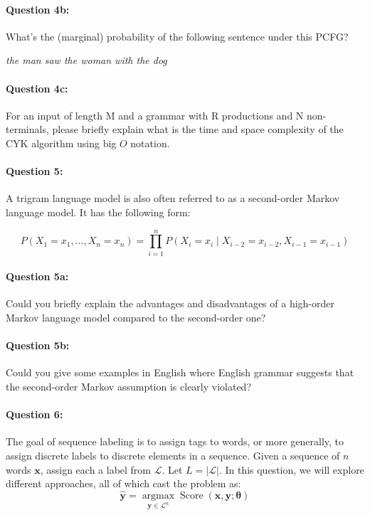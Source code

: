\documentclass[10pt]{article}
\begin{document}
\paragraph{Question 4b:} What's the (marginal) probability of the following sentence under this PCFG?

\textit{the man saw the woman with the dog}

\paragraph{Question 4c:} For an input of length M and a grammar with R productions and N non-terminals, please briefly explain what is the time and space complexity of the CYK algorithm using big $O$ notation.

\newpage

\paragraph{Question 5:} A trigram language model is also often referred to as a second-order Markov language model. It has the following form:

$$
  P\left(X_{1}=x_{1}, \ldots, X_{n}=x_{n}\right)=\prod_{i=1}^{n} P\left(X_{i}=x_{i} \mid X_{i-2}=x_{i-2}, X_{i-1}=x_{i-1}\right)
$$

\paragraph{Question 5a:} Could you briefly explain the advantages and disadvantages of a high-order Markov language model compared to the second-order one?

\paragraph{Question 5b:} Could you give some examples in English where English grammar suggests that the second-order Markov assumption is clearly violated?

\newpage



\paragraph{Question 6:} The goal of sequence labeling is to assign tags to words, or more generally, to assign discrete labels to discrete elements in a sequence. Given a sequence of $n$ words $\boldsymbol{x}$, assign each a label from $\mathcal{L}$. Let $L=|\mathcal{L}|$.
In this question, we will explore different approaches, all of which cast the problem as:
$$
  \hat{\boldsymbol{y}}=\underset{\boldsymbol{y} \in \mathcal{L}^n}{\operatorname{argmax}} \operatorname{Score}(\boldsymbol{x}, \boldsymbol{y} ; \boldsymbol{\theta})
$$
\end{document}
